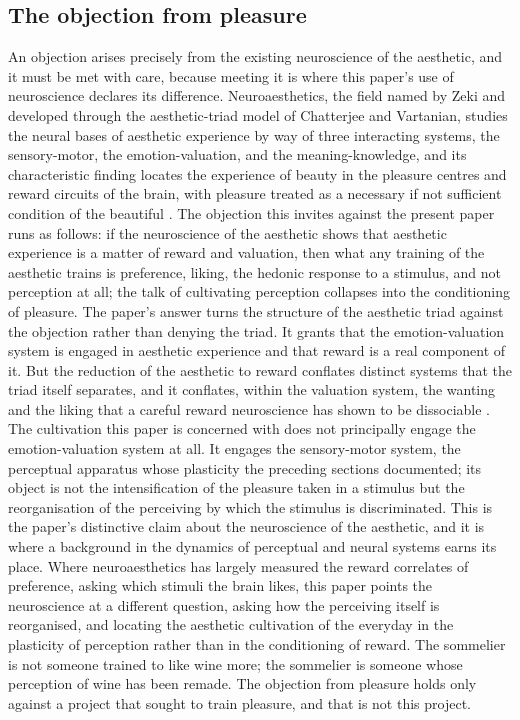 \subsection{The objection from pleasure}
\label{p23:sub:plas-neuroaesthetics}

An objection arises precisely from the existing neuroscience of the aesthetic, and it must be met with care, because meeting it is where this paper's use of neuroscience declares its difference. Neuroaesthetics, the field named by Zeki and developed through the aesthetic-triad model of Chatterjee and Vartanian, studies the neural bases of aesthetic experience by way of three interacting systems, the sensory-motor, the emotion-valuation, and the meaning-knowledge, and its characteristic finding locates the experience of beauty in the pleasure centres and reward circuits of the brain, with pleasure treated as a necessary if not sufficient condition of the beautiful \parencite{zeki1999,chatterjee2014}. The objection this invites against the present paper runs as follows: if the neuroscience of the aesthetic shows that aesthetic experience is a matter of reward and valuation, then what any training of the aesthetic trains is preference, liking, the hedonic response to a stimulus, and not perception at all; the talk of cultivating perception collapses into the conditioning of pleasure. The paper's answer turns the structure of the aesthetic triad against the objection rather than denying the triad. It grants that the emotion-valuation system is engaged in aesthetic experience and that reward is a real component of it. But the reduction of the aesthetic to reward conflates distinct systems that the triad itself separates, and it conflates, within the valuation system, the wanting and the liking that a careful reward neuroscience has shown to be dissociable \parencite{berridge2015,kringelbach2009}. The cultivation this paper is concerned with does not principally engage the emotion-valuation system at all. It engages the sensory-motor system, the perceptual apparatus whose plasticity the preceding sections documented; its object is not the intensification of the pleasure taken in a stimulus but the reorganisation of the perceiving by which the stimulus is discriminated. This is the paper's distinctive claim about the neuroscience of the aesthetic, and it is where a background in the dynamics of perceptual and neural systems earns its place. Where neuroaesthetics has largely measured the reward correlates of preference, asking which stimuli the brain likes, this paper points the neuroscience at a different question, asking how the perceiving itself is reorganised, and locating the aesthetic cultivation of the everyday in the plasticity of perception rather than in the conditioning of reward. The sommelier is not someone trained to like wine more; the sommelier is someone whose perception of wine has been remade. The objection from pleasure holds only against a project that sought to train pleasure, and that is not this project.

